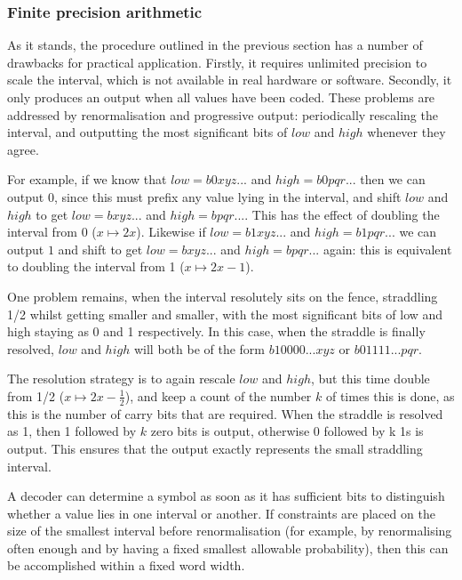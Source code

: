 \begin{informative*}
\subsubsection{Finite precision arithmetic}
As it stands, the procedure outlined in the previous section has a number of
drawbacks for practical application. Firstly, it requires unlimited precision
to scale the interval, which is not available in real hardware or software.
Secondly, it only produces an output when all values have been coded. These
problems are addressed by renormalisation and progressive output: periodically rescaling the
interval, and outputting the most significant bits of $low$ and $high$ whenever they agree.

For example, if we know that $low=b0xyz...$ and $high=b0pqr...$ then we can
output $0$, since this must prefix any value lying in the interval, 
and shift $low$ and $high$ to get $low=bxyz...$ and $high=bpqr...$.
This has the effect of doubling the interval from 0 ($x\mapsto 2x$). Likewise
if $low=b1xyz...$ and $high=b1pqr...$ we can output $1$ and shift to get
$low=bxyz...$ and $high=bpqr...$ again: this is equivalent to doubling the interval
from 1 ($x\mapsto 2x-1$).

One problem remains, when the interval resolutely sits on the fence, straddling
1/2 whilst getting smaller and smaller, with the most 
significant bits of low and high staying as 0 and 1 respectively. 
In this case, when the straddle is finally resolved, $low$ and $high$ will
both be of the form $b10000...xyz$ or $b01111...pqr$. 

The resolution strategy is to again rescale $low$ and $high$, but this time
double from 1/2 ($x\mapsto 2x-\frac{1}{2}$), and keep a count of the number $k$
of times this is done, as this is the number of carry bits that are
required. When the straddle is resolved as 1, then 1 followed by $k$ zero bits is 
output, otherwise 0 followed by k 1s is output. This ensures that the
output exactly represents the small straddling interval.

A decoder can determine a symbol as soon as it has sufficient bits to distinguish
whether a value lies in one interval or another. If constraints are placed on the
 size of the smallest interval before
renormalisation (for example, by renormalising often enough and by having a fixed
smallest allowable probability), then this can be accomplished within a fixed word width.

\end{informative*}
